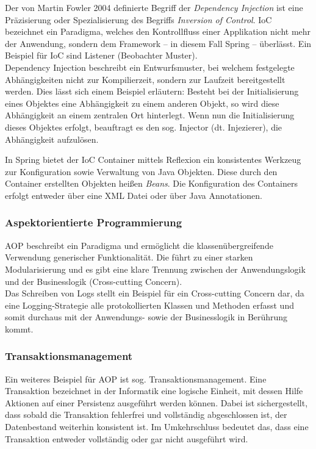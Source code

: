 				Der von Martin Fowler 2004 definierte Begriff der \textit{Dependency Injection} ist eine Präzisierung oder Spezialisierung des Begriffs \textit{Inversion of Control}. \ac{IoC} bezeichnet ein Paradigma, welches den Kontrollfluss einer Applikation nicht mehr der Anwendung, sondern dem Framework -- in diesem Fall Spring -- überlässt. Ein Beispiel für \ac{IoC} sind Listener (Beobachter Muster). \\
				Dependency Injection beschreibt ein Entwurfsmuster, bei welchem festgelegte Abhängigkeiten nicht zur Kompilierzeit, sondern zur Laufzeit bereitgestellt werden. Dies lässt sich einem Beispiel erläutern: Besteht bei der Initialisierung eines Objektes eine Abhängigkeit zu einem anderen Objekt, so wird diese Abhängigkeit an einem zentralen Ort hinterlegt. Wenn nun die Initialisierung dieses Objektes erfolgt, beauftragt es den sog. Injector (dt. Injezierer), die Abhängigkeit aufzulösen. \cite{MartinFowler.23.01.2020}
				
				In Spring bietet der \ac{IoC} Container mittels Reflexion ein konsistentes Werkzeug zur Konfiguration sowie Verwaltung von Java Objekten. Diese durch den Container erstellten Objekten heißen \textit{Beans}. Die Konfiguration des Containers erfolgt entweder über eine \ac{XML} Datei oder über Java Annotationen. \cite{Walls.20162017} 
				
			\subsubsection{Aspektorientierte Programmierung}
			
				\ac{AOP} beschreibt ein Paradigma und ermöglicht die klassenübergreifende Verwendung generischer Funktionalität. Die führt zu einer starken Modularisierung und es gibt eine klare Trennung zwischen der Anwendungslogik und der Businesslogik (Cross-cutting Concern). \cite{Wunderlich.2005} \\
				Das Schreiben von Logs stellt ein Beispiel für ein Cross-cutting Concern dar, da eine Logging-Strategie alle protokollierten Klassen und Methoden erfasst und somit durchaus mit der Anwendungs- sowie der Businesslogik in Berührung kommt. 
			
			\subsubsection{Transaktionsmanagement} %
			\label{frameworks.spring.transaktionsmanagement}
			
				Ein weiteres Beispiel für \ac{AOP} ist sog. Transaktionsmanagement. Eine Transaktion bezeichnet in der Informatik eine logische Einheit, mit dessen Hilfe Aktionen auf einer Persistenz ausgeführt werden können. Dabei ist sichergestellt, dass sobald die Transaktion fehlerfrei und vollständig abgeschlossen ist, der Datenbestand weiterhin konsistent ist. Im Umkehrschluss bedeutet das, dass eine Transaktion entweder vollständig oder gar nicht ausgeführt wird. \cite{Ozsu.2011}
			

